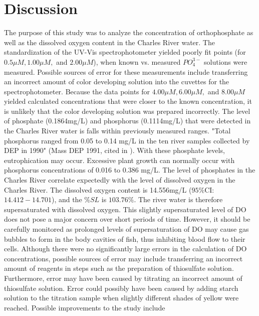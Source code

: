\section{Discussion}
The purpose of this study was to analyze the concentration of orthophosphate as well as the dissolved oxygen content in the Charles River water. The standardization of the UV-Vis spectrophotometer yielded poorly fit points (for $0.5\mu M, 1.00\mu M,$ and $2.00 \mu M$), when known vs. measured $PO_4^{3-}$ solutions were measured. Possible sources of error for these measurements include transferring an incorrect amount of color developing solution into the cuvettes for the spectrophotometer. Because the data points for $4.00 \mu M, 6.00 \mu M,$ and $8.00 \mu M$ yielded calculated concentrations that were closer to the known concentration, it is unlikely that the color developing solution was prepared incorrectly. 
	The level of phosphate (0.1864mg/L) and phosphorus (0.1114mg/L) that were detected in the Charles River water is falls within previously measured ranges. "Total phosphorus ranged from 0.05 to 0.14 mg/L in the ten river samples collected by DEP in 1990" (Mass DEP 1991, cited in \cite{CRWA}). With these phosphate levels, eutrophication may occur. Excessive plant growth can normally occur with phosphorus concentrations of 0.016 to 0.386 mg/L. \cite{CRWA} 
	The level of phosphates in the Charles River correlate expectedly with the level of dissolved oxygen in the Charles River. The dissolved oxygen content is 14.556mg/L ($95\%$CI: $14.412 − 14.701$), and the $\%SL$ is $103.76\%$. The river water is therefore supersaturated with dissolved oxygen. This slightly supersaturated level of DO does not pose a major concern over short periods of time. However, it should be carefully monitored as prolonged levels of supersaturation of DO may cause gas bubbles to form in the body cavities of fish, thus inhibiting blood flow to their cells. \cite{labmanual} 
	Although there were no significantly large errors in the calculation of DO concentrations, possible sources of error may include transferring an incorrect amount of reagents in steps such as the preparation of thiosulfate solution. Furthermore, error may have been caused by titrating an incorrect amount of thiosulfate solution. Error could possibly have been caused by adding starch solution to the titration sample when slightly different shades of yellow were reached. 
	Possible improvements to the study include 

